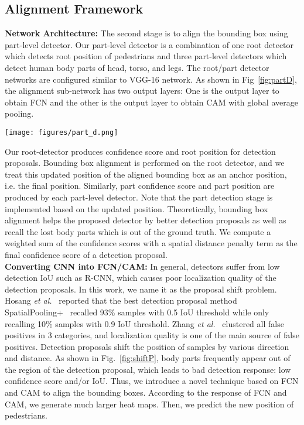 \documentclass[journal]{IEEEtran}
\begin{document}
\subsection{Alignment Framework}
\label{subsec:AlignmentFramework}
\textbf{Network Architecture:} The second stage is to align the bounding box using part-level detector. Our part-level detector is a combination of one root detector which detects root position of pedestrians and three part-level detectors which detect human body parts of head, torso, and legs. The root/part detector networks are configured similar to VGG-16 network. As shown in Fig~\ref{fig:partD}, the alignment sub-network has two output layers: One is the output layer to obtain FCN and the other is the output layer to obtain CAM with global average pooling.

\begin{figure*}[t]
\centering
\centerline{\texttt{[image: figures/part\_d.png]}}
\caption{Network architecture of the proposed part-level detector based on VGG-16 network with class activation map}
\label{fig:partD}
\end{figure*}

Our root-detector produces confidence score and root position for detection proposals. Bounding box alignment is performed on the root detector, and we treat this updated position of the aligned bounding box as an anchor position, i.e. the final position. Similarly, part confidence score and part position are produced by each part-level detector. Note that the part detection stage is implemented based on the updated position. Theoretically, bounding box alignment helps the proposed detector by better detection proposals as well as recall the lost body parts which is out of the ground truth. We compute a weighted sum of the confidence scores with a spatial distance penalty term as the final confidence score of a detection proposal.  \\

\textbf{Converting CNN into FCN/CAM:} In general, detectors suffer from low detection IoU such as R-CNN, which causes poor localization quality of the detection proposals. In this work, we name it as the proposal shift problem. Hosang \emph{et al.}~\cite{hosang2015taking} reported that the best detection proposal method SpatialPooling+~\cite{paisitkriangkrai2016pedestrian} recalled 93\% samples with 0.5 IoU threshold while only recalling 10\% samples with 0.9 IoU threshold. Zhang \emph{et al.}~\cite{Shanshan2016CVPR} clustered all false positives in 3 categories, and localization quality is one of the main source of false positives. Detection proposals shift the position of samples by various direction and distance. As shown in Fig.~\ref{fig:shiftP}, body parts frequently appear out of the region of the detection proposal, which leads to bad detection response: low confidence score and/or IoU. Thus, we introduce a novel technique based on FCN and CAM to align the bounding boxes. According to the response of FCN and CAM, we generate much larger heat maps. Then, we predict the new position of pedestrians.
\end{document}
